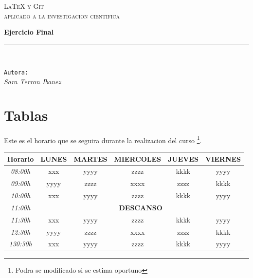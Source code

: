 \documentclass[10pt,a4paper]{report}
\author{Sara Terrón Ibáñez}
\begin{document}
\begin{titlepage}
\begin{center}
\begin{huge}
\vspace*{1cm}
\textsc{\hspace{1cm} \LaTeX \hspace{1cm} y \hspace{1cm} Git}\newline
\\[0.3cm]
\textsc{aplicado a la investigacion cientifica}\\
\vspace*{2.5cm}
\end{huge}
\begin{Huge}
\textbf{Ejercicio Final}\\
\end{Huge}
\vspace*{2.5cm}
\rule{90mm}{0.1mm}\\
\begin{Large}
\texttt{Autora:}\newline
\\[0.3cm]
\textsl{Sara Terron Ibanez}
\end{Large}
\end{center}
\end{titlepage}

\newpage
\tableofcontents

\chapter*{Tablas}

Este es el horario que se seguira durante la realizacion del curso \footnote{Podra se modificado si se estima oportuno}.\ \\
\begin{center}
\begin{tabular}{|c|c|c|c|c|c|}
\hline 
\textbf{Horario} & \textbf{LUNES} & \textbf{MARTES} & \textbf{MIERCOLES} & \textbf{JUEVES} & \textbf{VIERNES} \\
\hline 
\textit{08:00h} & xxx & yyyy & zzzz & kkkk & yyyy \\ 
\hline 
\textit{09:00h} & yyyy & zzzz & xxxx & zzzz & kkkk \\ 
\hline 
\textit{10:00h} & xxx & yyyy & zzzz & kkkk & yyyy \\ 
\hline
\textit{11:00h} & \multicolumn{5}{|c|}{\textbf{DESCANSO}} \\ 
\hline
\textit{11:30h} & xxx & yyyy & zzzz & kkkk & yyyy \\ 
\hline 
\textit{12:30h} & yyyy & zzzz & xxxx & zzzz & kkkk \\ 
\hline 
\textit{130:30h} & xxx & yyyy & zzzz & kkkk & yyyy \\ 
\hline 
\end{tabular}
\end{center}
\end{document}

